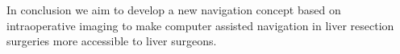In conclusion we aim to develop a new navigation concept based on intraoperative
imaging to make computer assisted navigation in liver resection surgeries more
accessible to liver surgeons. 




\endinput
